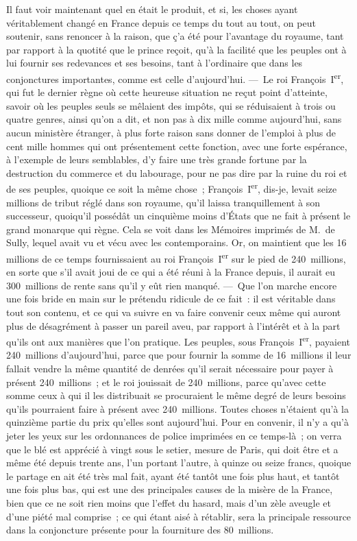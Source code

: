 \documentclass[french,twoside]{book} %
\begin{document}
Il faut voir maintenant quel en était le produit, et si, les choses ayant véritablement changé en France depuis ce temps du tout au tout, on peut soutenir, sans renoncer à la raison, que ç’a été pour l’avantage du royaume, tant par rapport à la quotité que le prince reçoit, qu’à la facilité que les peuples ont à lui fournir ses redevances et ses besoins, tant à l’ordinaire que dans les conjonctures importantes, comme est celle d’aujourd’hui. — Le roi François I\textsuperscript{er}, qui fut le dernier règne où cette heureuse situation ne reçut point d’atteinte, savoir où les peuples seuls se mêlaient des impôts, qui se réduisaient à trois ou quatre genres, ainsi qu’on a dit, et non pas à dix mille comme aujourd’hui, sans aucun ministère étranger, à plus forte raison sans donner de l’emploi à plus de cent mille hommes qui ont présentement cette fonction, avec une forte espérance, à l’exemple de leurs semblables, d’y faire une très grande fortune par la destruction du commerce et du labourage, pour ne pas dire par la ruine du roi et de ses peuples, quoique ce soit la même chose ; François I\textsuperscript{er}, dis-je, levait seize millions de tribut réglé dans son royaume, qu’il laissa tranquillement à son successeur, quoiqu’il possédât un cinquième moins d’États que ne fait à présent le grand monarque qui règne. Cela se voit dans les Mémoires imprimés de M. de Sully, lequel avait vu et vécu avec les contemporains. Or, on maintient que les 16 millions de ce temps fournissaient au roi François I\textsuperscript{er} sur le pied de 240 millions, en sorte que s’il avait joui de ce qui a été réuni à la France depuis, il aurait eu 300 millions de rente sans qu’il y eût rien manqué. — Que l’on marche encore une fois bride en main sur le prétendu ridicule de ce fait : il est véritable dans tout son contenu, et ce qui va suivre en va faire convenir ceux même qui auront plus de désagrément à passer un pareil aveu, par rapport à l’intérêt et à la part qu’ils ont aux manières que l’on pratique. Les peuples, sous François I\textsuperscript{er}, payaient 240 millions d’aujourd’hui, parce que pour fournir la somme de 16 millions il leur fallait vendre la même quantité de denrées qu’il serait nécessaire pour payer à présent 240 millions ; et le roi jouissait de 240 millions, parce qu’avec cette somme ceux à qui il les distribuait se procuraient le même degré de leurs besoins qu’ils pourraient faire à présent avec 240 millions. Toutes choses n’étaient qu’à la quinzième partie du prix qu’elles sont aujourd’hui. Pour en convenir, il n’y a qu’à jeter les yeux sur les ordonnances de police imprimées en ce temps-là ; on verra que le blé est apprécié à vingt sous le setier, mesure de Paris, qui doit être et a même été depuis trente ans, l’un portant l’autre, à quinze ou seize francs, quoique le partage en ait été très mal fait, ayant été tantôt une fois plus haut, et tantôt une fois plus bas, qui est une des principales causes de la misère de la France, bien que ce ne soit rien moins que l’effet du hasard, mais d’un zèle aveugle et d’une piété mal comprise ; ce qui étant aisé à rétablir, sera la principale ressource dans la conjoncture présente pour la fourniture des 80 millions.\par
\end{document}
